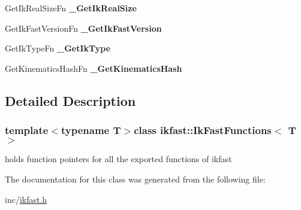 \begin{DoxyCompactItemize}
\item 
\hypertarget{classikfast_1_1IkFastFunctions_a6e0b57e5123af02f5d27c894eac23181}{Get\-Ik\-Real\-Size\-Fn {\bfseries \-\_\-\-Get\-Ik\-Real\-Size}}\label{classikfast_1_1IkFastFunctions_a6e0b57e5123af02f5d27c894eac23181}

\item 
\hypertarget{classikfast_1_1IkFastFunctions_a1deac46b905d3d6fa2186e4fb52a75a4}{Get\-Ik\-Fast\-Version\-Fn {\bfseries \-\_\-\-Get\-Ik\-Fast\-Version}}\label{classikfast_1_1IkFastFunctions_a1deac46b905d3d6fa2186e4fb52a75a4}

\item 
\hypertarget{classikfast_1_1IkFastFunctions_a22b3424efa52b1c611ad6ec426259aca}{Get\-Ik\-Type\-Fn {\bfseries \-\_\-\-Get\-Ik\-Type}}\label{classikfast_1_1IkFastFunctions_a22b3424efa52b1c611ad6ec426259aca}

\item 
\hypertarget{classikfast_1_1IkFastFunctions_a838b34f459abceb7b0f537ad3d4f834b}{Get\-Kinematics\-Hash\-Fn {\bfseries \-\_\-\-Get\-Kinematics\-Hash}}\label{classikfast_1_1IkFastFunctions_a838b34f459abceb7b0f537ad3d4f834b}

\end{DoxyCompactItemize}


\subsection{Detailed Description}
\subsubsection*{template$<$typename T$>$class ikfast\-::\-Ik\-Fast\-Functions$<$ T $>$}

holds function pointers for all the exported functions of ikfast 

The documentation for this class was generated from the following file\-:\begin{DoxyCompactItemize}
\item 
inc/\hyperlink{ikfast_8h}{ikfast.\-h}\end{DoxyCompactItemize}
